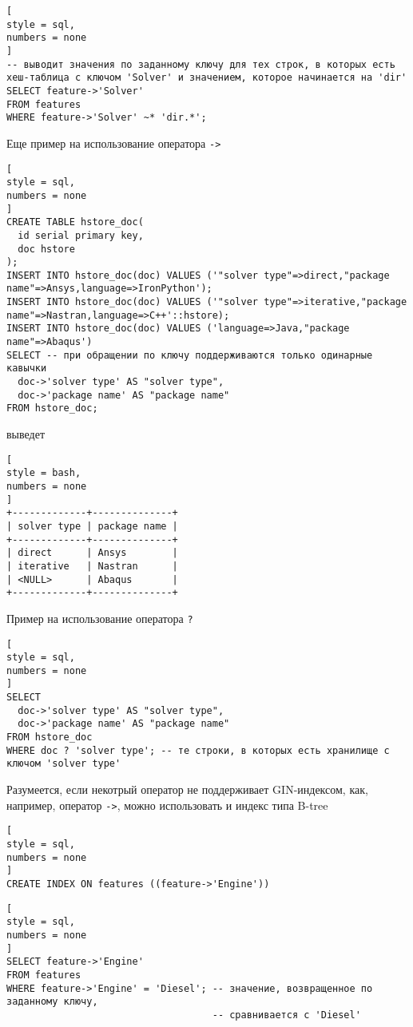 \documentclass[%
	11pt,
	a4paper,
	utf8,
		]{article}
\begin{document}
\begin{lstlisting}[
style = sql,
numbers = none
]
-- выводит значения по заданному ключу для тех строк, в которых есть хеш-таблица с ключом 'Solver' и значением, которое начинается на 'dir'
SELECT feature->'Solver'
FROM features
WHERE feature->'Solver' ~* 'dir.*';
\end{lstlisting}

Еще пример на использование оператора \verb|->|
\begin{lstlisting}[
style = sql,
numbers = none
]
CREATE TABLE hstore_doc(
  id serial primary key,
  doc hstore
);
INSERT INTO hstore_doc(doc) VALUES ('"solver type"=>direct,"package name"=>Ansys,language=>IronPython');
INSERT INTO hstore_doc(doc) VALUES ('"solver type"=>iterative,"package name"=>Nastran,language=>C++'::hstore);
INSERT INTO hstore_doc(doc) VALUES ('language=>Java,"package name"=>Abaqus')
SELECT -- при обращении по ключу поддерживаются только одинарные кавычки
  doc->'solver type' AS "solver type",
  doc->'package name' AS "package name"
FROM hstore_doc;
\end{lstlisting}
выведет
\begin{lstlisting}[
style = bash,
numbers = none
]
+-------------+--------------+
| solver type | package name |
+-------------+--------------+
| direct      | Ansys        |
| iterative   | Nastran      |
| <NULL>      | Abaqus       |
+-------------+--------------+
\end{lstlisting}

Пример на использование оператора \verb|?|
\begin{lstlisting}[
style = sql,
numbers = none
]
SELECT
  doc->'solver type' AS "solver type",
  doc->'package name' AS "package name"
FROM hstore_doc
WHERE doc ? 'solver type'; -- те строки, в которых есть хранилище с ключом 'solver type'
\end{lstlisting}




Разумеется, если некотрый оператор не поддерживает GIN-индексом, как, например, оператор \verb|->|, можно использовать и индекс типа B-tree
\begin{lstlisting}[
style = sql,
numbers = none
]
CREATE INDEX ON features ((feature->'Engine'))
\end{lstlisting}

\begin{lstlisting}[
style = sql,
numbers = none
]
SELECT feature->'Engine'
FROM features
WHERE feature->'Engine' = 'Diesel'; -- значение, возвращенное по заданному ключу,
                                    -- сравнивается с 'Diesel'
\end{lstlisting}
\end{document}
